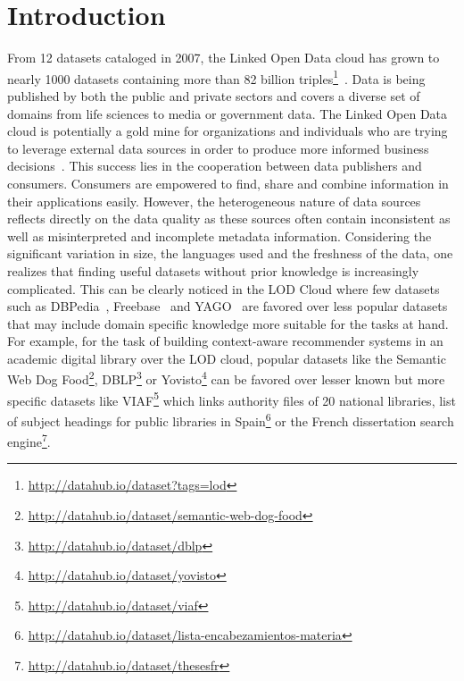 \documentclass[runningheads,a4paper]{../../Util/LaTEX/llncs}
\begin{document}
\section{Introduction}
\label{sec:introduction}
From 12 datasets cataloged in 2007, the Linked Open Data cloud has grown to nearly 1000 datasets containing more than 82 billion triples\footnote{\url{http://datahub.io/dataset?tags=lod}}~\cite{Bizer:IJSWIS:09}. Data is being published by both the public and private sectors and covers a diverse set of domains from life sciences to media or government data. The Linked Open Data cloud is potentially a gold mine for organizations and individuals who are trying to leverage external data sources in order to produce more informed business decisions~\cite{Boyd:Article:11}. This success lies in the cooperation between data publishers and consumers. Consumers are empowered to find, share and combine information in their applications easily. However, the heterogeneous nature of data sources reflects directly on the data quality as these sources often contain inconsistent as well as misinterpreted and incomplete metadata information. Considering the significant variation in size, the languages used and the freshness of the data, one realizes that finding useful datasets without prior knowledge is increasingly complicated. This can be clearly noticed in the LOD Cloud where few datasets such as DBPedia~\cite{Bizer:WebSemJorunal:09}, Freebase~\cite{Bollacker:SIGMOD:08} and YAGO~\cite{Suchanek::WWW:07} are favored over less popular datasets that may include domain specific knowledge more suitable for the tasks at hand. For example, for the task of building context-aware recommender systems in an academic digital library over the LOD cloud, popular datasets like the Semantic Web Dog Food\footnote{\url{http://datahub.io/dataset/semantic-web-dog-food}}, DBLP\footnote{\url{http://datahub.io/dataset/dblp}} or Yovisto\footnote{\url{http://datahub.io/dataset/yovisto}} can be favored over lesser known but more specific datasets like VIAF\footnote{\url{http://datahub.io/dataset/viaf}} which links authority files of 20 national libraries, list of subject headings for public libraries in Spain\footnote{\url{http://datahub.io/dataset/lista-encabezamientos-materia}} or the French dissertation search engine\footnote{\url{http://datahub.io/dataset/thesesfr}}.
\end{document}
